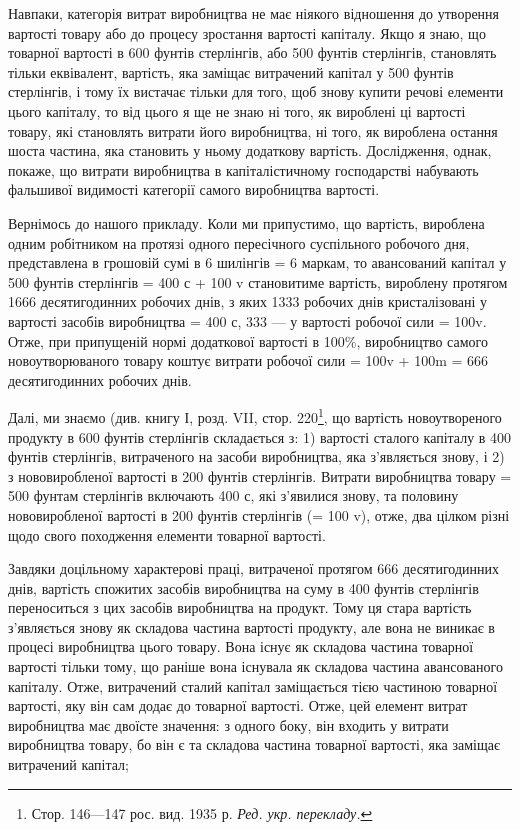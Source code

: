 
Навпаки, категорія витрат виробництва не має ніякого відношення
до утворення вартості товару або до процесу зростання
вартості капіталу. Якщо я знаю, що  товарної вартості
в 600 фунтів стерлінгів, або 500 фунтів стерлінгів, становлять
тільки еквівалент, вартість, яка заміщає витрачений капітал
у 500 фунтів стерлінгів, і тому їх вистачає тільки для того, щоб
знову купити речові елементи цього капіталу, то від цього
я ще не знаю ні того, як вироблені ці   вартості товару, які
становлять витрати його виробництва, ні того, як вироблена
остання шоста частина, яка становить у ньому додаткову вартість.
Дослідження, однак, покаже, що витрати виробництва в капіталістичному
господарстві набувають фальшивої видимості категорії
самого виробництва вартості.

Вернімось до нашого прикладу. Коли ми припустимо, що вартість,
вироблена одним робітником на протязі одного пересічного
суспільного робочого дня, представлена в грошовій сумі
в 6 шилінгів = 6 маркам, то авансований капітал у 500 фунтів
стерлінгів = 400 с + 100 v становитиме вартість, вироблену протягом
1666  десятигодинних робочих днів, з яких 1333  робочих
днів кристалізовані у вартості засобів виробництва = 400 с,
333   — у вартості робочої сили = 100v. Отже, при припущеній
нормі додаткової вартості в 100\%, виробництво самого новоутворюваного
товару коштує витрати робочої сили = 100v +
100m = 666   десятигодинних робочих днів.

Далі, ми знаємо (див. книгу І, розд. VII, стор. 220\footnote*{Стор. 146—147 рос. вид. 1935 р. \emph{Ред. укр. перекладу.}}, що вартість
новоутвореного продукту в 600 фунтів стерлінгів складається
з: 1) вартості сталого капіталу в 400 фунтів стерлінгів,
витраченого на засоби виробництва, яка з’являється знову, і
2) з нововиробленої вартості в 200 фунтів стерлінгів. Витрати
виробництва товару = 500 фунтам стерлінгів включають 400 с,
які з’явилися знову, та половину нововиробленої вартості в
200 фунтів стерлінгів (= 100 v), отже, два цілком різні щодо
свого походження елементи товарної вартості.

Завдяки доцільному характерові праці, витраченої протягом
666   десятигодинних днів, вартість спожитих засобів виробництва
на суму в 400 фунтів стерлінгів переноситься з цих
засобів виробництва на продукт. Тому ця стара вартість з’являється
знову як складова частина вартості продукту, але вона
не виникає в процесі виробництва цього товару. Вона існує як
складова частина товарної вартості тільки тому, що раніше вона
існувала як складова частина авансованого капіталу. Отже, витрачений
сталий капітал заміщається тією частиною товарної
вартості, яку він сам додає до товарної вартості. Отже, цей
елемент витрат виробництва має двоїсте значення: з одного боку,
він входить у витрати виробництва товару, бо він є та складова
частина товарної вартості, яка заміщає витрачений капітал;
\parbreak{}  %
